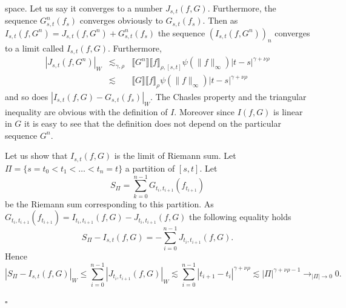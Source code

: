 \documentclass[a4paper,11pt]{article}
\newenvironment{proof}{{\sc Proof.}}{\hfill$\square$}
\begin{document}
\begin{proof}
  space. Let us say it converges to a number $J_{s,t} (f,G)$. Furthermore, the sequence
  $G_{s,t}^{n} (f_{s} )$ converges obviously to $G_{s,t} (f_{s} )$. Then as
  $I_{s,t} (f,G^{n} ) =J_{s,t} (f,G^{n} ) +G_{s,t}^{n} (f_{s} )$ the sequence
  $( I_{s,t} (f,G^{n} ) )_{n}$ converges to a limit called $I_{s,t} (f,G)$.
  Furthermore,
  \begin{eqnarray*}
    |J_{s,t} (f,G^{n} )|_{W} & \lesssim_{\gamma , \rho} & \llbracket G^{n}
    \rrbracket \llbracket f \rrbracket_{\rho , [s,t]} \psi ( \|f\|_{\infty} )
    |t-s|^{\gamma + \nu \rho}\\
    & \lesssim & \llbracket G \rrbracket \llbracket f \rrbracket_{\rho} \psi
    ( \|f\|_{\infty} ) |t-s|^{\gamma + \nu \rho}
  \end{eqnarray*}
  and so does $|I_{s,t} (f,G)-G_{s,t} (f_{s} )|_{W}$. The Chasles property and
  the triangular inequality are obvious with the definition of $I$. Moreover
  since $I (f,G)$ is linear in $G$ it is easy to see that the definition does
  not depend on the particular sequence $G^{n}$.
  
  Let us show that $I_{s,t} (f,G)$ is the limit of Riemann sum. Let $\Pi =
  \{s=t_{0} <t_{1} < \ldots <t_{n} =t\}$ a partition of $[s,t]$. Let
  \[ S_{\Pi} = \sum_{k=0}^{n-1} G_{t_{i} ,t_{i+1}} (f_{t_{i+1}} ) \]
  be the Riemann sum corresponding to this partition. As $G_{t_{i} ,t_{i+1}}
  (f_{t_{i+1}} ) =I_{t_{i} ,t_{i+1}} (f,G) -J_{t_{i} ,t_{i+1}} (f,G)$ the
  following equality holds
  \[ S_{\Pi} -I_{s,t} (f,G) =- \sum_{i=0}^{n-1} J_{t_{i} ,t_{i+1}} (f,G). \]
  Hence
  \begin{equation*}
    |S_{\Pi} -I_{s,t} (f,G)|_{W}  \leqslant  \sum_{i=0}^{n-1} |J_{t_{i}
    ,t_{i+1}} (f,G)|_{W}
    \lesssim   \sum_{i=0}^{n-1} |t_{i+1} -t_{i} |^{\gamma + \nu \rho}
     \lesssim  | \Pi |^{\gamma + \nu \rho -1} \to_{| \Pi | \to 0} 0.
  \end{equation*}
  

\end{proof}
\end{document}
